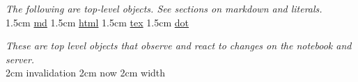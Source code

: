 \textit{The following are top-level objects. See sections on markdown and literals.}\\
\api%
{1.5cm}{
\href{https://github.com/observablehq/stdlib#md}{md}
}%
{1.5cm}{
\href{https://github.com/observablehq/stdlib#html}{html}
}%
{1.5cm}{
\href{https://github.com/observablehq/stdlib#tex}{tex}
}
{1.5cm}{
\href{https://github.com/observablehq/stdlib#dot}{dot}
}\stopapi


\textit{These are top level objects that observe and react to changes on the notebook and server.}\\
\api%
{2cm}{
invalidation
}%
{2cm}{
now
}%
{2cm}{
width
}\stopapi

